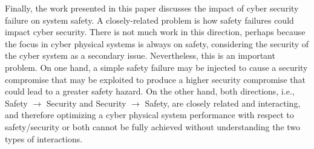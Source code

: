 \documentclass[journal]{IEEEtran}
\begin{document}
Finally, the work presented in this paper discusses the impact of cyber security failure on system safety. A closely-related problem is how safety failures could impact cyber security. There is not much work in this direction, perhaps because the focus in cyber physical systems is always on safety, considering the security of the cyber system as a secondary issue. Nevertheless, this is an important problem. On one hand, a simple safety failure may be injected to cause a security compromise that may be exploited to produce a higher security compromise that could lead to a greater safety hazard. On the other hand, both directions, i.e., Safety $\rightarrow$ Security and Security $\rightarrow$ Safety, are closely related and interacting, and therefore optimizing a cyber physical system performance with respect to safety/security or both cannot be fully achieved without understanding the two types of interactions.

\end{document}
